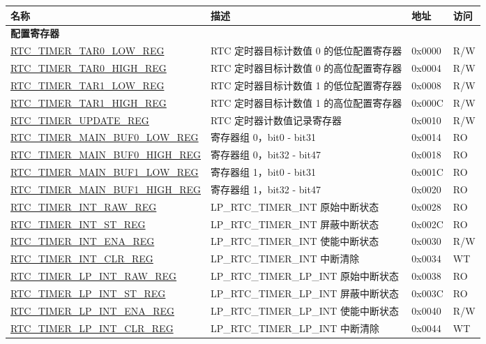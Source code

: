 \begin{longtable}{ | l | l | l | l |}
\hline\rowcolor{lightgray}
\textbf{名称} & \textbf{描述} &  \textbf{地址} & \textbf{访问} \\ \hline
\endhead
\multicolumn{4}{|l|}{\textbf{配置寄存器}} \\ \hline
\hyperref[regdesc:RTCTIMERTAR0LOWREG]{RTC\_TIMER\_TAR0\_LOW\_REG} & RTC 定时器目标计数值 0 的低位配置寄存器 & 0x0000 & R/W \\ \hline
\hyperref[regdesc:RTCTIMERTAR0HIGHREG]{RTC\_TIMER\_TAR0\_HIGH\_REG} & RTC 定时器目标计数值 0 的高位配置寄存器 & 0x0004 & R/W \\ \hline
\hyperref[regdesc:RTCTIMERTAR1LOWREG]{RTC\_TIMER\_TAR1\_LOW\_REG} & RTC 定时器目标计数值 1 的低位配置寄存器 & 0x0008 & R/W \\ \hline
\hyperref[regdesc:RTCTIMERTAR1HIGHREG]{RTC\_TIMER\_TAR1\_HIGH\_REG} & RTC 定时器目标计数值 1 的高位配置寄存器 & 0x000C & R/W \\ \hline
\hyperref[regdesc:RTCTIMERUPDATEREG]{RTC\_TIMER\_UPDATE\_REG} & RTC 定时器计数值记录寄存器 & 0x0010 & R/W \\ \hline
\hyperref[regdesc:RTCTIMERMAINBUF0LOWREG]{RTC\_TIMER\_MAIN\_BUF0\_LOW\_REG} & 寄存器组 0，bit0 - bit31 & 0x0014 & RO \\ \hline
\hyperref[regdesc:RTCTIMERMAINBUF0HIGHREG]{RTC\_TIMER\_MAIN\_BUF0\_HIGH\_REG} & 寄存器组 0，bit32 - bit47 & 0x0018 & RO \\ \hline
\hyperref[regdesc:RTCTIMERMAINBUF1LOWREG]{RTC\_TIMER\_MAIN\_BUF1\_LOW\_REG} & 寄存器组 1，bit0 - bit31 & 0x001C & RO \\ \hline
\hyperref[regdesc:RTCTIMERMAINBUF1HIGHREG]{RTC\_TIMER\_MAIN\_BUF1\_HIGH\_REG} & 寄存器组 1，bit32 - bit47  & 0x0020 & RO \\ \hline
\hyperref[regdesc:RTCTIMERINTRAWREG]{RTC\_TIMER\_INT\_RAW\_REG} & LP\_RTC\_TIMER\_INT 原始中断状态  & 0x0028 & RO \\ \hline
\hyperref[regdesc:RTCTIMERINTSTREG]{RTC\_TIMER\_INT\_ST\_REG} & LP\_RTC\_TIMER\_INT 屏蔽中断状态  & 0x002C & RO \\ \hline
\hyperref[regdesc:RTCTIMERINTENAREG]{RTC\_TIMER\_INT\_ENA\_REG} & LP\_RTC\_TIMER\_INT 使能中断状态  & 0x0030 & R/W \\ \hline
\hyperref[regdesc:RTCTIMERINTCLRREG]{RTC\_TIMER\_INT\_CLR\_REG} & LP\_RTC\_TIMER\_INT 中断清除  & 0x0034 & WT \\ \hline
\hyperref[regdesc:RTCTIMERLPINTRAWREG]{RTC\_TIMER\_LP\_INT\_RAW\_REG} & LP\_RTC\_TIMER\_LP\_INT 原始中断状态  & 0x0038 & RO \\ \hline
\hyperref[regdesc:RTCTIMERLPINTSTREG]{RTC\_TIMER\_LP\_INT\_ST\_REG} & LP\_RTC\_TIMER\_LP\_INT 屏蔽中断状态  & 0x003C & RO \\ \hline
\hyperref[regdesc:RTCTIMERLPINTENAREG]{RTC\_TIMER\_LP\_INT\_ENA\_REG} & LP\_RTC\_TIMER\_LP\_INT 使能中断状态  & 0x0040 & R/W \\ \hline
\hyperref[regdesc:RTCTIMERLPINTCLRREG]{RTC\_TIMER\_LP\_INT\_CLR\_REG} & LP\_RTC\_TIMER\_LP\_INT 中断清除  & 0x0044 & WT \\ \hline
\end{longtable}
